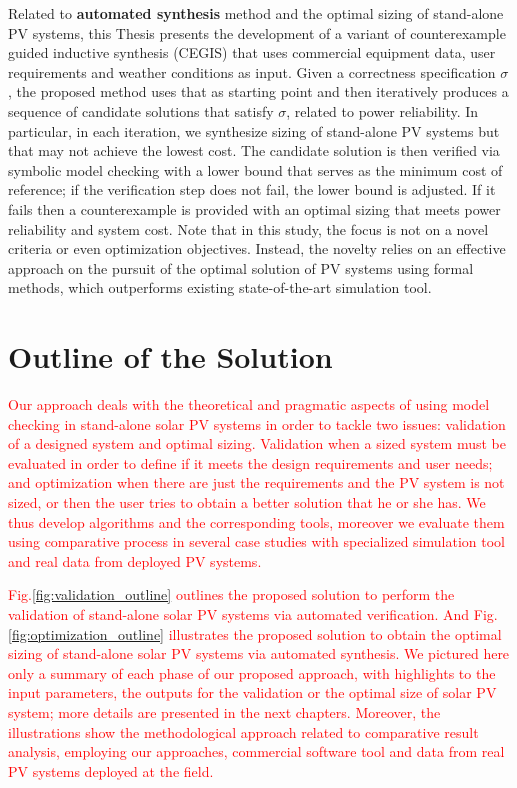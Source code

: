 Related to \textbf{automated synthesis} method and the optimal sizing of stand-alone PV systems, this Thesis presents the development of a variant of counterexample guided inductive synthesis (CEGIS) that uses commercial equipment data, user requirements and weather conditions as input. 
Given a correctness specification $\sigma$, the proposed method uses that as starting point 
and then iteratively produces a sequence of candidate solutions that satisfy $\sigma$, 
related to power reliability. In particular, in each iteration, we synthesize sizing of 
stand-alone PV systems but that may not achieve the lowest cost. The candidate solution 
is then verified via symbolic model checking with a lower bound that serves as the minimum 
cost of reference; if the verification step does not fail, the lower bound is adjusted. 
If it fails then a counterexample is provided with an optimal sizing that meets 
power reliability and system cost. Note that in this study, the focus is not on a novel criteria or even optimization objectives. Instead, the novelty relies on an effective approach on the pursuit of the optimal solution of PV systems using formal methods, which outperforms existing state-of-the-art simulation tool.


\section{Outline of the Solution}

\textcolor{red}{Our approach deals with the theoretical and pragmatic aspects of using model checking in stand-alone solar PV systems in order to tackle two issues: validation of a designed system and optimal sizing. Validation when a sized system must be evaluated in order to define if it meets the design requirements and user needs; and optimization when there are just the requirements and the PV system is not sized, or then the user tries to obtain a better solution that he or she has. We thus develop algorithms and the corresponding tools, moreover we evaluate them using comparative process in several case studies with specialized simulation tool and real data from deployed PV systems.} 

\textcolor{red}{Fig.\ref{fig:validation_outline} outlines the proposed solution to perform the validation of stand-alone solar PV systems via automated verification. And Fig.\ref{fig:optimization_outline} illustrates the proposed solution to obtain the optimal sizing of stand-alone solar PV systems via automated synthesis. We pictured here only a summary of each phase of our proposed approach, with highlights to the input parameters, the outputs for the validation or the optimal size of solar PV system; more details are presented in the next chapters. Moreover, the illustrations show the methodological approach related to comparative result analysis, employing our approaches, commercial software tool and data from real PV systems deployed at the field.}

